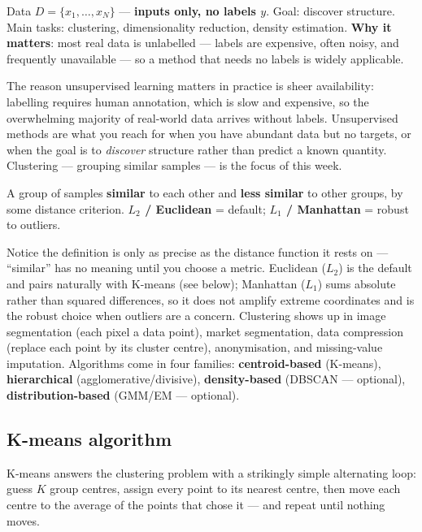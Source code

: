 \documentclass[11pt, a4paper]{article}
\newcommand{\kw}[1]{\textbf{#1}}
\begin{document}
\begin{setupbox}
Data $D=\{x_1,\dots,x_N\}$ — \kw{inputs only, no labels $y$}. Goal: discover structure. Main tasks:
clustering, dimensionality reduction, density estimation. \kw{Why it matters}: most real data is
unlabelled — labels are expensive, often noisy, and frequently unavailable — so a method that needs
no labels is widely applicable.
\end{setupbox}

The reason unsupervised learning matters in practice is sheer availability: labelling requires human
annotation, which is slow and expensive, so the overwhelming majority of real-world data arrives
without labels. Unsupervised methods are what you reach for when you have abundant data but no
targets, or when the goal is to \emph{discover} structure rather than predict a known quantity.
Clustering — grouping similar samples — is the focus of this week.

\begin{defbox}[cluster]
A group of samples \kw{similar} to each other and \kw{less similar} to other groups, by some
distance criterion. \kw{$L_2$ / Euclidean} = default; \kw{$L_1$ / Manhattan} = robust to outliers.
\end{defbox}

Notice the definition is only as precise as the distance function it rests on — ``similar'' has no
meaning until you choose a metric. Euclidean ($L_2$) is the default and pairs naturally with
K-means (see below); Manhattan ($L_1$) sums absolute rather than squared differences, so it does not
amplify extreme coordinates and is the robust choice when outliers are a concern. Clustering shows
up in image segmentation (each pixel a data point), market segmentation, data compression (replace
each point by its cluster centre), anonymisation, and missing-value imputation. Algorithms come in
four families: \kw{centroid-based} (K-means), \kw{hierarchical} (agglomerative/divisive),
\kw{density-based} (DBSCAN — optional), \kw{distribution-based} (GMM/EM — optional).

\subsection{K-means algorithm}

K-means answers the clustering problem with a strikingly simple alternating loop: guess $K$ group
centres, assign every point to its nearest centre, then move each centre to the average of the
points that chose it — and repeat until nothing moves.
\end{document}
